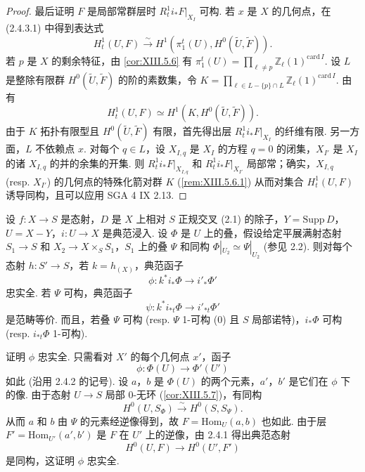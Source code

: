 \begin{proof}
最后证明 $F$ 是局部常群层时 $R^1_t i_* F|_{X_I}$ 可构. 若 $x$ 是 $X$ 的几何点，在 (2.4.3.1) 中得到表达式
\[
H^1_t(U, F) \xrightarrow{\sim} H^1(\pi^t_1(U), H^0(\widetilde{U}, \widetilde{F})).
\]
若 $p$ 是 $X$ 的剩余特征，由 \ref{cor:XIII.5.6} 有 $\pi^t_1(U) = \prod_{\ell \neq p} \mathbb{Z}_\ell(1)^{\mathrm{card}\, I}$. 设 $L$ 是整除有限群 $H^0(\widetilde{U}, \widetilde{F})$ 的阶的素数集，令 $K = \prod_{\ell \in L - \{p\} \cap L} \mathbb{Z}_\ell(1)^{\mathrm{card}\, I}$. 由 \cite[第一章 §5 例 2]{exp13-4} 有
\[
H^1_t(U, F) \simeq H^1(K, H^0(\widetilde{U}, \widetilde{F})).
\]
由于 $K$ 拓扑有限型且 $H^0(\widetilde{U}, \widetilde{F})$ 有限，首先得出层 $R^1_t i_* F|_{X_I}$ 的纤维有限. 另一方面，$L$ 不依赖点 $x$. 对每个 $q \in L$，设 $X_{I,q}$ 是 $X_I$ 的方程 $q = 0$ 的闭集，$X_{I'}$ 是 $X_I$ 的诸 $X_{I,q}$ 的并的余集的开集. 则 $R^1_t i_* F|_{X_{I,q}}$ 和 $R^1_t i_* F|_{X_{I'}}$ 局部常；确实，$X_{I,q}$ (resp. $X_{I'}$) 的几何点的特殊化箭对群 $K$ (\cref{rem:XIII.5.6.1}) 从而对集合 $H^1_t(U, F)$ 诱导同构，且可以应用 SGA 4 IX 2.13.
\end{proof}

\begin{corollary}\label{cor:XIII.2.5}
设 $f \colon X \to S$ 是态射，$D$ 是 $X$ 上相对 $S$ 正规交叉 (2.1) 的除子，$Y = \mathrm{Supp}\, D$，$U = X - Y$，$i \colon U \to X$ 是典范浸入. 设 $\Phi$ 是 $U$ 上的叠，假设给定平展满射态射 $S_1 \to S$ 和 $X_2 \to X \times_S S_1$，$S_1$ 上的叠 $\Psi$ 和同构 $\Phi|_{U_2} \simeq \Psi|_{U_2}$ (参见 2.2).
则对每个态射 $h \colon S' \to S$，若 $k = h_{(X)}$，典范函子
\[
\phi \colon k^{*} i_* \Phi \longrightarrow i'_* \Phi'
\]
忠实全. 若 $\Psi$ 可构，典范函子
\[
\psi \colon k^{*} i_{*t} \Phi \longrightarrow i'_{*t} \Phi'
\]
是范畴等价.
而且，若叠 $\Psi$ 可构 (resp. $\Psi$ 1-可构 (0) 且 $S$ 局部诺特)，$i_* \Phi$ 可构 (resp. $i_{*t} \Phi$ 1-可构).
\end{corollary}

证明 $\phi$ 忠实全. 只需看对 $X'$ 的每个几何点 $x'$，函子
\[
\phi \colon \Phi(U) \longrightarrow \Phi'(U')
\]
如此 (沿用 2.4.2 的记号). 设 $a$，$b$ 是 $\Phi(U)$ 的两个元素，$a'$，$b'$ 是它们在 $\phi$ 下的像. 由于态射 $U \to S$ 局部 0-无环 (\cref{cor:XIII.5.7})，有同构
\[
H^0(U, S_\Phi) \xrightarrow{\sim} H^0(S, S_\Psi).
\]
从而 $a$ 和 $b$ 由 $\Psi$ 的元素经逆像得到，故 $F = \mathrm{Hom}_U(a, b)$ 也如此. 由于层 $F' = \mathrm{Hom}_{U'}(a', b')$ 是 $F$ 在 $U'$ 上的逆像，由 2.4.1 得出典范态射
\[
H^0(U, F) \longrightarrow H^0(U', F')
\]
是同构，这证明 $\phi$ 忠实全.

